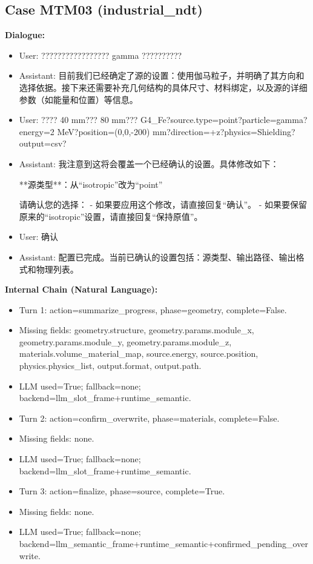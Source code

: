 \documentclass[11pt]{ctexart}
\begin{document}
\subsection{Case MTM03 (industrial\_ndt)}
\textbf{Dialogue:}
\begin{itemize}
\item User: ????????????????? gamma ??????????
\item Assistant: 目前我们已经确定了源的设置：使用伽马粒子，并明确了其方向和选择依据。接下来还需要补充几何结构的具体尺寸、材料绑定，以及源的详细参数（如能量和位置）等信息。
\item User: ???? 40 mm??? 80 mm??? G4\_Fe?source.type=point?particle=gamma?energy=2 MeV?position=(0,0,-200) mm?direction=+z?physics=Shielding?output=csv?
\item Assistant: 我注意到这将会覆盖一个已经确认的设置。具体修改如下：

**源类型**：从“isotropic”改为“point”

请确认您的选择：
- 如果要应用这个修改，请直接回复“确认”。
- 如果要保留原来的“isotropic”设置，请直接回复“保持原值”。
\item User: 确认
\item Assistant: 配置已完成。当前已确认的设置包括：源类型、输出路径、输出格式和物理列表。
\end{itemize}
\textbf{Internal Chain (Natural Language):}
\begin{itemize}
\item Turn 1: action=summarize\_progress, phase=geometry, complete=False.
\item Missing fields: geometry.structure, geometry.params.module\_x, geometry.params.module\_y, geometry.params.module\_z, materials.volume\_material\_map, source.energy, source.position, physics.physics\_list, output.format, output.path.
\item LLM used=True; fallback=none; backend=llm\_slot\_frame+runtime\_semantic.
\item Turn 2: action=confirm\_overwrite, phase=materials, complete=False.
\item Missing fields: none.
\item LLM used=True; fallback=none; backend=llm\_slot\_frame+runtime\_semantic.
\item Turn 3: action=finalize, phase=source, complete=True.
\item Missing fields: none.
\item LLM used=True; fallback=none; backend=llm\_semantic\_frame+runtime\_semantic+confirmed\_pending\_overwrite.
\end{itemize}
\end{document}
